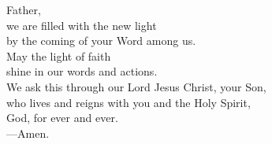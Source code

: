 \prayer

\begin{prayerverse}

Father,\\
we are filled with the new light\\
by the coming of your Word among us.\\
May the light of faith\\
shine in our words and actions.\\
We ask this through our Lord Jesus Christ, your Son,\\
who lives and reigns with you and the Holy Spirit,\\
God, for ever and ever.\\
{\color{red}---\thinspace}Amen.

\end{prayerverse}
